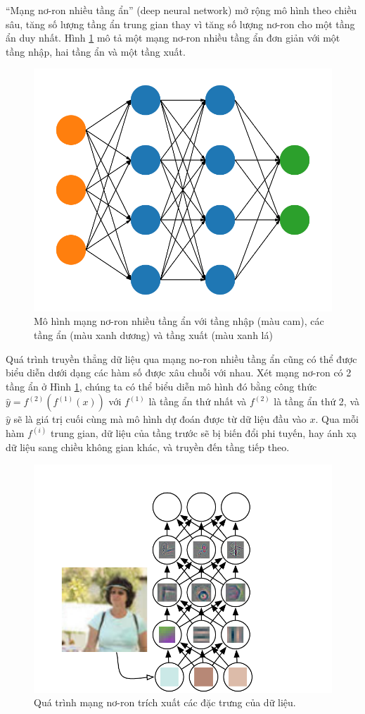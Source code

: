 ``Mạng nơ-ron nhiều tầng ẩn'' (deep neural network) mở rộng mô hình theo chiều sâu, tăng số lượng tầng ẩn trung gian thay vì tăng số lượng nơ-ron cho một tầng ẩn duy nhất. Hình \ref{fig:dnn} mô tả một mạng nơ-ron nhiều tầng ẩn đơn giản với một tầng nhập, hai tầng ẩn và một tầng xuất.

\begin{figure}[H]
\centering
\includegraphics[width=80 mm]{images/dnn.png}
\caption{Mô hình mạng nơ-ron nhiều tầng ẩn với tầng nhập (màu cam), các tầng ẩn (màu xanh dương) và tầng xuất (màu xanh lá)}
\label{fig:dnn}
\end{figure}

Quá trình truyền thẳng dữ liệu qua mạng no-ron nhiều tầng ẩn cũng có thể được biểu diễn dưới dạng các hàm số được xâu chuỗi với nhau. Xét mạng nơ-ron có 2 tầng ẩn ở Hình \ref{fig:dnn}, chúng ta có thể biểu diễn mô hình đó bằng công thức $\hat{y}=f^{(2)}(f^{(1)}(x))$ với $f^{(1)}$ là tầng ẩn thứ nhất và $f^{(2)}$ là tầng ẩn thứ 2, và $\hat{y}$ sẽ là giá trị cuối cùng mà mô hình dự đoán được từ dữ liệu đầu vào $x$. Qua mỗi hàm $f^{(i)}$ trung gian, dữ liệu của tầng trước sẽ bị biến đổi phi tuyến, hay ánh xạ dữ liệu sang chiều không gian khác, và truyền đến tầng tiếp theo.

\begin{figure}[H]
\centering
\includegraphics[width=80 mm]{images/dnn-features.png}
\caption{Quá trình mạng nơ-ron trích xuất các đặc trưng của dữ liệu\cite{goodfellow2016deeplearning}.}
\label{fig:dnn-features}
\end{figure}

